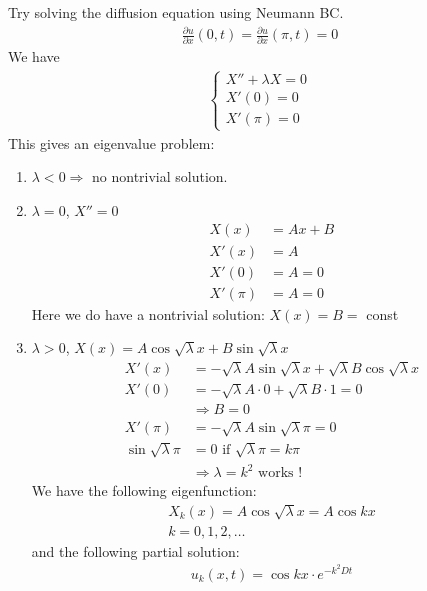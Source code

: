 \documentclass[12pt, letterpaper]{article}
\begin{document}
Try solving the diffusion equation using Neumann BC.
\begin{align*}
    \frac{\partial u}{\partial x}(0,t) = \frac{\partial u}{\partial x} (\pi,t) = 0
\end{align*}
We have 
\begin{align*}
    \begin{cases}
        X'' + \lambda X = 0 \\
        X'(0) = 0 \\
        X'(\pi) = 0
    \end{cases} \tag{$\ast$}
\end{align*}
This gives an eigenvalue problem:
\begin{enumerate}
    \item $\lambda < 0 \Rightarrow $ no nontrivial solution.
    \item $\lambda = 0$, $X'' = 0$
    \begin{align*}
        X(x) &= Ax + B \\
        X'(x) &= A \\
        X'(0) &= A = 0 \\
        X'(\pi) &= A = 0
    \end{align*}
    Here we do have a nontrivial solution: $X(x) = B = $ const 
    \item $\lambda > 0$, $X(x) = A\cos\sqrt \lambda x + B \sin \sqrt \lambda x$
    \begin{align*}
        X'(x) &= -\sqrt \lambda A \sin \sqrt{\lambda} x + \sqrt \lambda B \cos \sqrt \lambda x \\
        X'(0) &= - \sqrt \lambda A \cdot 0 + \sqrt \lambda B \cdot 1 = 0 \\
        &\Rightarrow B = 0 \\
        X'(\pi) &= -\sqrt \lambda A \sin \sqrt \lambda \pi = 0  \\
        \sin \sqrt \lambda \pi &= 0 \text{ if } \sqrt \lambda \pi = k\pi \\
        &\Rightarrow \lambda = k^2 \text{ works !}
    \end{align*}
    We have the following eigenfunction:
    \begin{align*}
        X_k (x) = A\cos \sqrt \lambda x = A \cos kx\\
        k = 0,1,2,\dots
    \end{align*}
    and the following partial solution:
    \begin{align*}
        u_k(x,t) = \cos kx \cdot e^{-k^2Dt}
    \end{align*}

\end{enumerate}
\end{document}

